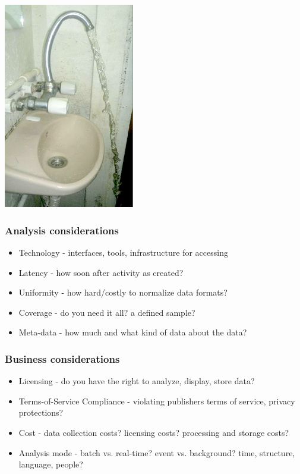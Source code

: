 \documentclass{beamer}
\begin{document}
\begin{frame}
  \begin{center}
    \includegraphics[height=9cm]{./imgs/sinkfail.png}
  \end{center}
\end{frame}



\begin{frame}\frametitle{Analysis considerations}
{\Large
\begin{itemize}
\item Technology - interfaces, tools, infrastructure for accessing
\item Latency - how soon after activity as created?
\item Uniformity - how hard/costly to normalize data formats?
\item Coverage - do you need it all? a defined sample?
\item Meta-data -  how much and what kind of data about the data?
\end{itemize}
}
\end{frame}


\begin{frame}\frametitle{Business considerations}
{\Large
\begin{itemize}
\item Licensing - do you have the right to analyze, display, store data?
\item Terms-of-Service Compliance - violating publishers terms of service, privacy protections?
\item Cost - data collection costs? licensing costs? processing and storage costs?
\item Analysis mode - batch vs. real-time? event vs. background? time, structure, language, people?
\end{itemize}
}
\end{frame}
\end{document}
